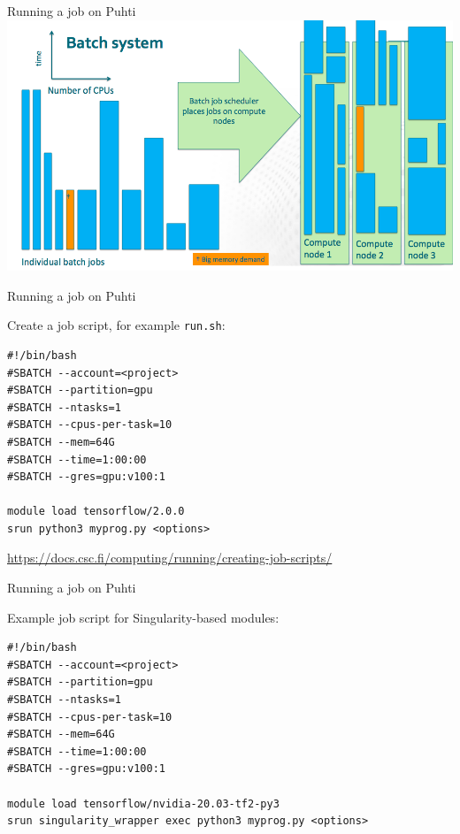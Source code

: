 \documentclass[aspectratio=1610,14pt]{beamer}
\newcommand{\link}[1]{\alert{\url{#1}}}
\begin{document}
\begin{frame}{Running a job on Puhti}
  \includegraphics[width=\textwidth]{slurm2.png}
\end{frame}

\begin{frame}[fragile]{Running a job on Puhti}

  Create a job script, for example {\tt run.sh}:
  
\begin{verbatim}
#!/bin/bash
#SBATCH --account=<project>
#SBATCH --partition=gpu
#SBATCH --ntasks=1
#SBATCH --cpus-per-task=10
#SBATCH --mem=64G
#SBATCH --time=1:00:00
#SBATCH --gres=gpu:v100:1

module load tensorflow/2.0.0
srun python3 myprog.py <options>
\end{verbatim}

{\small \link{https://docs.csc.fi/computing/running/creating-job-scripts/}}
\end{frame}

\begin{frame}[fragile]{Running a job on Puhti}

  Example job script for Singularity-based modules:
  
\begin{verbatim}
#!/bin/bash
#SBATCH --account=<project>
#SBATCH --partition=gpu
#SBATCH --ntasks=1
#SBATCH --cpus-per-task=10
#SBATCH --mem=64G
#SBATCH --time=1:00:00
#SBATCH --gres=gpu:v100:1

module load tensorflow/nvidia-20.03-tf2-py3
srun singularity_wrapper exec python3 myprog.py <options>
\end{verbatim}

\end{frame}
\end{document}
